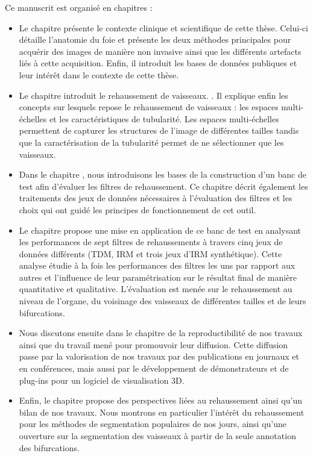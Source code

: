 Ce manuscrit est organisé en \chapTotal{} chapitres : 

\begin{itemize}
\item Le chapitre \chapContextN{} présente le contexte clinique et scientifique de cette thèse. Celui-ci détaille l'anatomie du foie et présente les deux méthodes principales pour acquérir des images de manière non invasive ainsi que les différents artefacts liés à cette acquisition. Enfin, il introduit les bases de données publiques et leur intérêt dans le contexte de cette thèse.
\item Le chapitre \chapSOTAN{} introduit le rehaussement de vaisseaux. . Il explique enfin les concepts sur lesquels repose le rehaussement de vaisseaux : les espaces multi-échelles et les caractéristiques de tubularité. Les espaces multi-échelles permettent de capturer les structures de l'image de différentes tailles tandis que la caractérisation de la tubularité permet de ne sélectionner que les vaisseaux.
\item Dans le chapitre \chapBenchN, nous introduisons les bases de la construction d'un banc de test afin d'évaluer les filtres de rehaussement. Ce chapitre décrit également les traitements des jeux de données nécessaires à l'évaluation des filtres et les choix qui ont guidé les principes de fonctionnement de cet outil.
\item Le chapitre \chapAnalysisN{} propose une mise en application de ce banc de test en analysant les performances de sept filtres de rehaussements à travers cinq jeux de données différents (TDM, IRM et trois jeux d'IRM synthétique). Cette analyse étudie à la fois les performances des filtres les uns par rapport aux autres et l'influence de leur paramétrisation sur le résultat final de manière quantitative et qualitative. L'évaluation est menée sur le rehaussement au niveau de l'organe, du voisinage des vaisseaux de différentes tailles et de leurs bifurcations. 
\item Nous discutons ensuite dans le chapitre \chapReproN{} de la reproductibilité de nos travaux ainsi que du travail mené pour promouvoir leur diffusion. Cette diffusion passe par la valorisation de nos travaux par des publications en journaux et en conférences, mais aussi par le développement de démonstrateurs et de plug-ins pour un logiciel de visualisation 3D.
\item Enfin, le chapitre \chapEndN{} propose des perspectives liées au rehaussement ainsi qu'un bilan de nos travaux. Nous montrons en particulier l'intérêt du rehaussement pour les méthodes de segmentation populaires de nos jours, ainsi qu'une ouverture sur la segmentation des vaisseaux à partir de la seule annotation des bifurcations.
\end{itemize}
    
